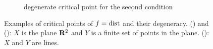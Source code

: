 \begin{figure}[tbp]
\begin{subfigure}[tbp]{.3\textwidth}
    \caption{degenerate critical point for the second condition}
    \label{F:sub-degen2}
  \end{subfigure}
  \caption[Examples of critical points and their degeneracy.]{Examples of critical points of $f = \operatorname{dist}$ and their degeneracy. () and (): $X$ is the plane $\mathbf{R}^2$ and $Y$ is a finite set of points in the plane. (): $X$ and $Y$ are lines.}
  \label{F:nondegenerate}
\end{figure}

